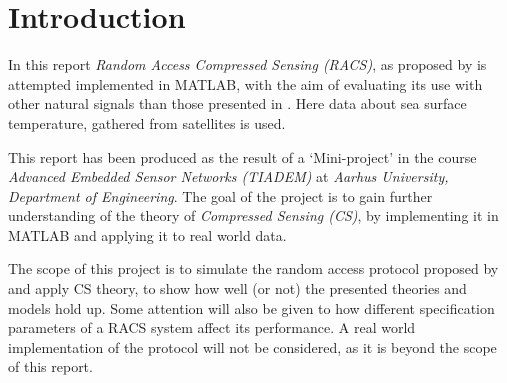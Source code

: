 \documentclass[Main]{subfiles}
\begin{document}
\section{Introduction} %
\label{sec:introduction}
	In this report \emph{Random Access Compressed Sensing (RACS)}, as proposed by  is attempted implemented in MATLAB, with the aim of evaluating its use with other natural signals than those presented in .
	Here data about sea surface temperature, gathered from satellites is used.

	This report has been produced as the result of a `Mini-project' in the course \emph{Advanced Embedded Sensor Networks (TIADEM)} at \emph{Aarhus University, Department of Engineering}.
	The goal of the project is to gain further understanding of the theory of \emph{Compressed Sensing (CS)}, by implementing it in MATLAB and applying it to real world data.

	The scope of this project is to simulate the random access protocol proposed by  and apply CS theory, to show how well (or not) the presented theories and models hold up.
	Some attention will also be given to how different specification parameters of a RACS system affect its performance.  
	A real world implementation of the protocol will not be considered, as it is beyond the scope of this report.



\end{document}
